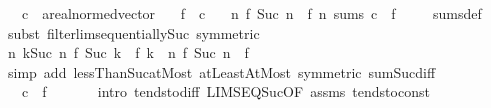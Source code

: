 \begin{isabellebody}
\ \ \ c\ {\isacharcolon}{\kern0pt}{\isacharcolon}{\kern0pt}\ {\isachardoublequoteopen}{\isacharprime}{\kern0pt}a{\isacharcolon}{\kern0pt}{\isacharcolon}{\kern0pt}real{\isacharunderscore}{\kern0pt}normed{\isacharunderscore}{\kern0pt}vector{\isachardoublequoteclose}\isanewline
\ \ \ {\isachardoublequoteopen}f\ {\isasymlonglonglongrightarrow}\ c{\isachardoublequoteclose}\isanewline
\ \ \ {\isachardoublequoteopen}{\isacharparenleft}{\kern0pt}{\isasymlambda}n{\isachardot}{\kern0pt}\ f\ {\isacharparenleft}{\kern0pt}Suc\ n{\isacharparenright}{\kern0pt}\ {\isacharminus}{\kern0pt}\ f\ n{\isacharparenright}{\kern0pt}\ sums\ {\isacharparenleft}{\kern0pt}c\ {\isacharminus}{\kern0pt}\ f\ {}{\isacharparenright}{\kern0pt}{\isachardoublequoteclose}\isanewline
%
\isadelimproof
\ \ %
\endisadelimproof
%
\isatagproof
{}\isamarkupfalse%
\ sums{\isacharunderscore}{\kern0pt}def\isanewline
{}\isamarkupfalse%
\ {\isacharparenleft}{\kern0pt}subst\ filterlim{\isacharunderscore}{\kern0pt}sequentially{\isacharunderscore}{\kern0pt}Suc\ {\isacharbrackleft}{\kern0pt}symmetric{\isacharbrackright}{\kern0pt}{\isacharparenright}{\kern0pt}\isanewline
\ \ \isamarkupfalse%
\ {\isachardoublequoteopen}{\isacharparenleft}{\kern0pt}{\isasymlambda}n{\isachardot}{\kern0pt}\ {\isasymSum}k{\isacharless}{\kern0pt}Suc\ n{\isachardot}{\kern0pt}\ f\ {\isacharparenleft}{\kern0pt}Suc\ k{\isacharparenright}{\kern0pt}\ {\isacharminus}{\kern0pt}\ f\ k{\isacharparenright}{\kern0pt}\ {\isacharequal}{\kern0pt}\ {\isacharparenleft}{\kern0pt}{\isasymlambda}n{\isachardot}{\kern0pt}\ f\ {\isacharparenleft}{\kern0pt}Suc\ n{\isacharparenright}{\kern0pt}\ {\isacharminus}{\kern0pt}\ f\ {}{\isacharparenright}{\kern0pt}{\isachardoublequoteclose}\isanewline
\ \ \ \ \isamarkupfalse%
\ {\isacharparenleft}{\kern0pt}simp\ add{\isacharcolon}{\kern0pt}\ lessThan{\isacharunderscore}{\kern0pt}Suc{\isacharunderscore}{\kern0pt}atMost\ atLeast{}AtMost\ {\isacharbrackleft}{\kern0pt}symmetric{\isacharbrackright}{\kern0pt}\ sum{\isacharunderscore}{\kern0pt}Suc{\isacharunderscore}{\kern0pt}diff{\isacharparenright}{\kern0pt}\isanewline
\ \ \isamarkupfalse%
\ \isamarkupfalse%
\ {\isachardoublequoteopen}{\isasymdots}\ {\isasymlonglonglongrightarrow}\ c\ {\isacharminus}{\kern0pt}\ f\ {}{\isachardoublequoteclose}\isanewline
\ \ \ \ \isamarkupfalse%
\ {\isacharparenleft}{\kern0pt}intro\ tendsto{\isacharunderscore}{\kern0pt}diff\ LIMSEQ{\isacharunderscore}{\kern0pt}Suc{\isacharbrackleft}{\kern0pt}OF\ assms{\isacharbrackright}{\kern0pt}\ tendsto{\isacharunderscore}{\kern0pt}const{\isacharparenright}{\kern0pt}\isanewline

\end{isabellebody}
